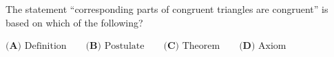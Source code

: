 The statement ``corresponding parts of congruent triangles are congruent'' is based on which of the following?

$\textbf{(A) } \text{Definition} \qquad \textbf{(B) } \text{Postulate} \qquad \textbf{(C) } \text{Theorem} \qquad \textbf{(D) } \text{Axiom}$
